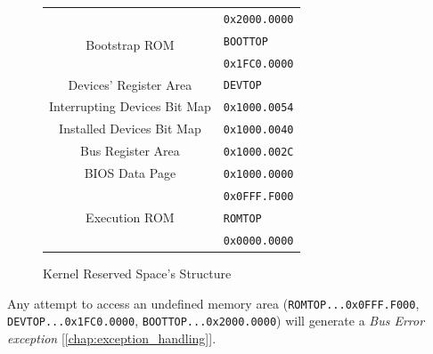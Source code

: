 \documentclass[12pt,a4paper,openright,twoside]{report}
\begin{document}
  \begin{figure}[ht]
  \centering
  \begin{tabular}{cl}
  \multicolumn{1}{l}{} & \multirow{2}{*}{\texttt{0x2000.0000}} \\ \cline{1-1}
  \multicolumn{1}{|l|}{\cellcolor{gray}} &  \\ [-3ex]
  \multicolumn{1}{|l|}{\cellcolor{gray}} & \multirow{2}{*}{\texttt{BOOTTOP}} \\ \cline{1-1}
  \multicolumn{1}{|c|}{\multirow{2}{*}{Bootstrap ROM}} &  \\ [-1ex]
  \multicolumn{1}{|c|}{} & \multirow{2}{*}{\texttt{0x1FC0.0000}} \\ \cline{1-1}
  \multicolumn{1}{|l|}{\multirow{2}{*}{\cellcolor{gray}}} &  \\ [-3ex]
  \multicolumn{1}{|l|}{\cellcolor{gray}} & \multirow{2}{*}{\texttt{DEVTOP}} \\ \cline{1-1}
  \multicolumn{1}{|c|}{\multirow{2}{*}{Devices' Register Area}} &  \\ [-1ex]
  \multicolumn{1}{|c|}{} & \multirow{2}{*}{\texttt{0x1000.0054}} \\ \cline{1-1}
  \multicolumn{1}{|c|}{\multirow{2}{*}{Interrupting Devices Bit Map}} &  \\ [-1ex]
  \multicolumn{1}{|c|}{} & \multirow{2}{*}{\texttt{0x1000.0040}} \\ \cline{1-1}
  \multicolumn{1}{|c|}{\multirow{2}{*}{Installed Devices Bit Map}} &  \\ [-1ex]
  \multicolumn{1}{|c|}{} & \multirow{2}{*}{\texttt{0x1000.002C}} \\ \cline{1-1}
  \multicolumn{1}{|c|}{\multirow{2}{*}{Bus Register Area}} &  \\ [-1ex]
  \multicolumn{1}{|c|}{} & \multirow{2}{*}{\texttt{0x1000.0000}} \\ \cline{1-1}
  \multicolumn{1}{|c|}{\multirow{2}{*}{BIOS Data Page}} &  \\ [-1ex]
  \multicolumn{1}{|c|}{} & \multirow{2}{*}{\texttt{0x0FFF.F000}} \\ \cline{1-1}
  \multicolumn{1}{|l|}{\multirow{2}{*}{\cellcolor{gray}}} &  \\ [-3ex]
  \multicolumn{1}{|l|}{\cellcolor{gray}} & \multirow{2}{*}{\texttt{ROMTOP}} \\ \cline{1-1}
  \multicolumn{1}{|c|}{\multirow{2}{*}{Execution ROM}} &  \\ [-1ex]
  \multicolumn{1}{|c|}{} & \multirow{2}{*}{\texttt{0x0000.0000}} \\ \cline{1-1}
  \multicolumn{1}{l}{} & 
  \end{tabular}
  \caption{Kernel Reserved Space's Structure}
  \label{fig:kernel_reserved_space}
  \end{figure}
  Any attempt to access an undefined memory area (\texttt{ROMTOP...0x0FFF.F000}, \texttt{DEVTOP...0x1FC0.0000}, \texttt{BOOTTOP...0x2000.0000}) will generate a \textit{Bus Error exception} [\autoref{chap:exception_handling}]. 
\end{document}
